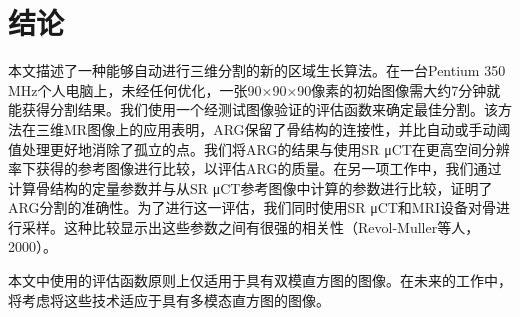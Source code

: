 \section{结论}\label{sec:conclusion}

本文描述了一种能够自动进行三维分割的新的区域生长算法。在一台Pentium 350 MHz个人电脑上，未经任何优化，一张90×90×90像素的初始图像需大约7分钟就能获得分割结果。我们使用一个经测试图像验证的评估函数来确定最佳分割。该方法在三维MR图像上的应用表明，ARG保留了骨结构的连接性，并比自动或手动阈值处理更好地消除了孤立的点。我们将ARG的结果与使用SR μCT在更高空间分辨率下获得的参考图像进行比较，以评估ARG的质量。在另一项工作中，我们通过计算骨结构的定量参数并与从SR μCT参考图像中计算的参数进行比较，证明了ARG分割的准确性。为了进行这一评估，我们同时使用SR μCT和MRI设备对骨进行采样。这种比较显示出这些参数之间有很强的相关性（Revol-Muller等人，2000\cite{revol2000bone}）。

本文中使用的评估函数原则上仅适用于具有双模直方图的图像。在未来的工作中，将考虑将这些技术适应于具有多模态直方图的图像。
